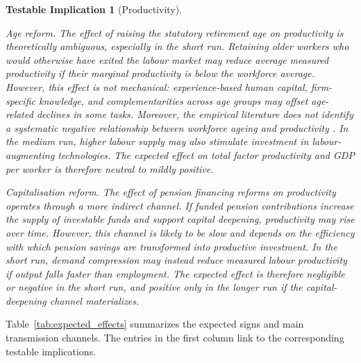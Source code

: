 \documentclass[11pt,english,a4paper, twoside, authoryear]{article}
\newtheorem{testable}{Testable Implication}}
\begin{document}
\begin{testable}[Productivity]\label{test:prod}

\emph{Age reform.} The effect of raising the statutory retirement age on productivity is theoretically ambiguous, especially in the short run. Retaining older workers who would otherwise have exited the labour market may reduce average measured productivity if their marginal productivity is below the workforce average. However, this effect is not mechanical: experience-based human capital, firm-specific knowledge, and complementarities across age groups may offset age-related declines in some tasks. Moreover, the empirical literature does not identify a systematic negative relationship between workforce ageing and productivity \citep{Dai2022}. In the medium run, higher labour supply may also stimulate investment in labour-augmenting technologies. The expected effect on total factor productivity and GDP per worker is therefore neutral to mildly positive.

\emph{Capitalisation reform.} The effect of pension financing reforms on productivity operates through a more indirect channel. If funded pension contributions increase the supply of investable funds and support capital deepening, productivity may rise over time. However, this channel is likely to be slow and depends on the efficiency with which pension savings are transformed into productive investment. In the short run, demand compression may instead reduce measured labour productivity if output falls faster than employment. The expected effect is therefore negligible or negative in the short run, and positive only in the longer run if the capital-deepening channel materializes.
\end{testable}


Table~\ref{tab:expected_effects} summarizes the expected signs and main transmission channels. The entries in the first column link to the corresponding testable implications.

\clearpage
\end{document}
